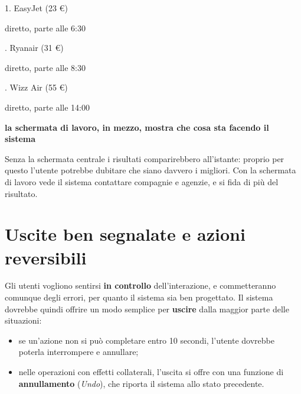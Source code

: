 \begin{center}
\begin{minipage}[t]{0.25\linewidth}
\begin{tcolorbox}[schermo]
    1. EasyJet (23 €)\par\hspace*{0.8em}diretto, parte alle 6:30\par{}. Ryanair (31 €)\par\hspace*{0.8em}diretto, parte alle 8:30\par{}. Wizz Air (55 €)\par\hspace*{0.8em}diretto, parte alle 14:00
  \end{tcolorbox}
\end{minipage}
\par\smallskip
{\scriptsize\hspace*{0.3\linewidth}\textcolor{swteal}{\textbf{la schermata di lavoro, in mezzo, mostra che cosa sta
facendo il sistema}}}
\end{center}

Senza la schermata centrale i risultati comparirebbero all'istante: proprio per questo l'utente potrebbe dubitare che
siano davvero i migliori. Con la schermata di lavoro vede il sistema contattare compagnie e agenzie, e si fida di più del
risultato.

\section{Uscite ben segnalate e azioni reversibili}

Gli utenti vogliono sentirsi \textbf{in controllo} dell'interazione, e commetteranno comunque degli errori, per quanto
il sistema sia ben progettato. Il sistema dovrebbe quindi offrire un modo semplice per \textbf{uscire} dalla maggior
parte delle situazioni:

\begin{itemize}
  \item se un'azione non si può completare entro 10 secondi, l'utente dovrebbe poterla interrompere e annullare;
  \item nelle operazioni con effetti collaterali, l'uscita si offre con una funzione di \textbf{annullamento}
        (\textit{Undo}), che riporta il sistema allo stato precedente.
\end{itemize}


